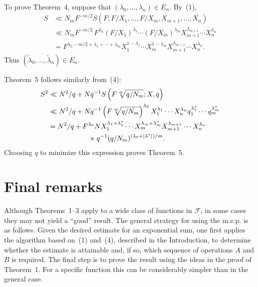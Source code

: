 \documentclass[10pt]{article}
\begin{document}
To prove Theorem~4, suppose that $(\lambda_0,\ldots,\lambda_n)\in E_n$. By~(1),
\[
\begin{aligned}
  S&\ll N_mF^{-m/2}
  S(F;F/X_1,\ldots,F/X_m,X_{m+1},\ldots,X_n)\\
  &\ll N_mF^{-m/2}\,
  F^{\lambda_0}(F/X_1)^{\lambda_1}\cdots(F/X_m)^{\lambda_m}
  X_{m+1}^{\lambda_{m+1}}\cdots X_n^{\lambda_n}\\
  &=F^{\lambda_0-m/2+\lambda_1+\cdots+\lambda_m}
  X_1^{1-\lambda_1}\cdots X_m^{1-\lambda_m}
  X_{m+1}^{\lambda_{m+1}}\cdots X_n^{\lambda_n}.
\end{aligned}
\]
Thus $(\widetilde\lambda_0,\ldots,\widetilde\lambda_n)\in E_n$.

Theorem~5 follows similarly from~(4):
\[
\begin{aligned}
  S^2
  &\ll N^2/q+Nq^{-1}S\left(F\sqrt[m]{q/N_m};X,q\right)\\
  &\ll N^2/q+Nq^{-1}
  \left(F\sqrt[m]{q/N_m}\right)^{\lambda_0}
  X_1^{\lambda_1}\cdots X_n^{\lambda_n}
  q_1^{\lambda_1^*}\cdots q_m^{\lambda_m^*}\\
  &=N^2/q+F^{\lambda_0}N
  X_1^{\lambda_1+\lambda_1^*}\cdots X_m^{\lambda_m+\lambda_m^*}
  X_{m+1}^{\lambda_{m+1}}\cdots X_n^{\lambda_n}\\
  &\hspace{20mm}\times q^{-1}(q/N_m)^{(\lambda_0+|\lambda^*|)/m}.
\end{aligned}
\]
Choosing $q$ to minimize this expression proves Theorem~5.

\section{Final remarks}

Although Theorems~1--3 apply to a wide class of functions in $\mathscr F$, in some cases they may not yield a ``good'' result. The general strategy for using the m.e.p. is as follows. Given the desired estimate for an exponential sum, one first applies the algorithm based on~(1) and~(4), described in the Introduction, to determine whether the estimate is attainable and, if so, which sequence of operations $A$ and $B$ is required. The final step is to prove the result using the ideas in the proof of Theorem~1. For a specific function this can be considerably simpler than in the general case.
\end{document}
